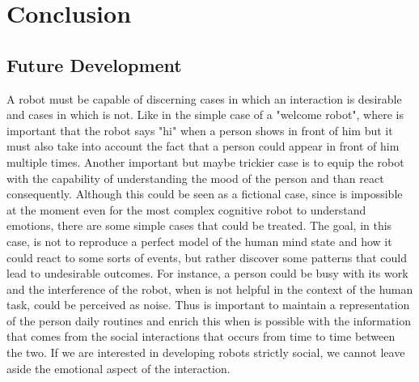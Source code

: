 \documentclass[pdftex,12pt,a4paper]{report}
\begin{document}
\chapter{Conclusion}\label{sec:conclusion}

\section{Future Development}
A robot must be capable of discerning cases in which an interaction is desirable and cases in which is not. Like in the simple case of a "welcome robot", where is important that the robot says "hi" when a person shows in front of him but it must also take into account the fact that a person could appear in front of him multiple times. 
Another important but maybe trickier case is to equip the robot with the capability of understanding the mood of the person and than react consequently. Although this could be seen as a fictional case, since is impossible at the moment even for the most complex cognitive robot to understand emotions, there are some simple cases that could be treated. The goal, in this case, is not to reproduce a perfect model of the human mind state and how it could react to some sorts of events, but rather discover some patterns that could lead to undesirable outcomes. For instance, a person could be busy with its work and the interference of the robot, when is not helpful in the context of the human task, could be perceived as noise. Thus is important to maintain a representation of the person daily routines and enrich this when is possible with the information that comes from the social interactions that occurs from time to time between the two. If we are interested in developing robots strictly social, we cannot leave aside the emotional aspect of the interaction. 
\end{document}
